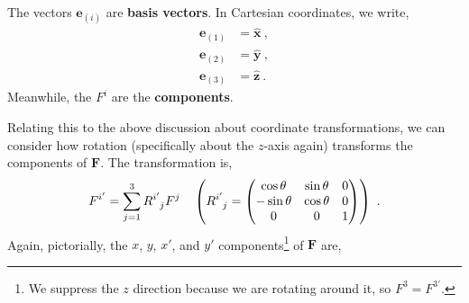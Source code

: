 \documentclass[11pt]{article}
\begin{document}
The vectors $\textbf{e}_{(i)}$ are \textbf{basis vectors}. In Cartesian coordinates, we write,
\begin{align}
\textbf{e}_{(1)} &= \hat{\textbf{x}}\ ,\\
\textbf{e}_{(2)} &= \hat{\textbf{y}}\ ,\\
\textbf{e}_{(3)} &= \hat{\textbf{z}}\ .
\end{align}
Meanwhile, the $F^i$ are the \textbf{components}.

Relating this to the above discussion about coordinate transformations, we can consider how rotation (specifically about the $z$-axis again) transforms the components of $\textbf{F}$. The transformation is,
\begin{equation}
F^{i'} = \sum_{j=1}^3 \tensor{R}{^{i'}_{j}} F^j\ \ \ \left(\tensor{R}{^{i'}_{j}} = \begin{pmatrix}
\cos\theta& \sin\theta & 0\\
-\sin\theta & \cos\theta & 0\\
0 & 0 & 1\\
\end{pmatrix}\right)\ .\label{sumComp}
\end{equation}
Again, pictorially, the $x$, $y$, $x'$, and $y'$ components\footnote{We suppress the $z$ direction because we are rotating around it, so $F^3 = F^{3'}$.} of $\textbf{F}$ are,

\begin{figure}[H]    
\centering
{}
\caption{}
\end{figure}
\end{document}
